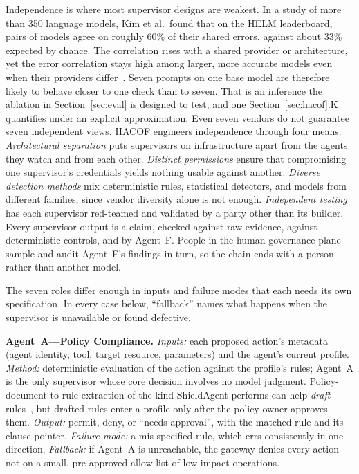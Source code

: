\documentclass[journal]{IEEEtran}
\newcommand{\hacof}{HACOF}
\begin{document}
Independence is where most supervisor designs are weakest. In a study of more than 350 language models, Kim et al.\ found that on the HELM leaderboard, pairs of models agree on roughly 60\% of their shared errors, against about 33\% expected by chance. The correlation rises with a shared provider or architecture, yet the error correlation stays high among larger, more accurate models even when their providers differ~\cite{kim2025correlated}.
Seven prompts on one base model are therefore likely to behave closer to one check than to seven. That is an inference the ablation in Section~\ref{sec:eval} is designed to test, and one Section~\ref{sec:hacof}.K quantifies under an explicit approximation. Even seven vendors do not guarantee seven independent views. \hacof{} engineers independence through four means. \textit{Architectural separation} puts supervisors on infrastructure apart from the agents they watch and from each other. \textit{Distinct permissions} ensure that compromising one supervisor's credentials yields nothing usable against another. \textit{Diverse detection methods} mix deterministic rules, statistical detectors, and models from different families, since vendor diversity alone is not enough. \textit{Independent testing} has each supervisor red-teamed and validated by a party other than its builder. Every supervisor output is a claim, checked against raw evidence, against deterministic controls, and by Agent~F. People in the human governance plane sample and audit Agent~F's findings in turn, so the chain ends with a person rather than another model.

The seven roles differ enough in inputs and failure modes that each needs its own specification. In every case below, ``fallback'' names what happens when the supervisor is unavailable or found defective.

\textbf{Agent~A---Policy Compliance.} \textit{Inputs:} each proposed action's metadata (agent identity, tool, target resource, parameters) and the agent's current profile. \textit{Method:} deterministic evaluation of the action against the profile's rules; Agent~A is the only supervisor whose core decision involves no model judgment. Policy-document-to-rule extraction of the kind ShieldAgent performs can help \textit{draft} rules~\cite{chen2025shieldagent},
but drafted rules enter a profile only after the policy owner approves them. \textit{Output:} permit, deny, or ``needs approval'', with the matched rule and its clause pointer. \textit{Failure mode:} a mis-specified rule, which errs consistently in one direction. \textit{Fallback:} if Agent~A is unreachable, the gateway denies every action not on a small, pre-approved allow-list of low-impact operations.
\end{document}
